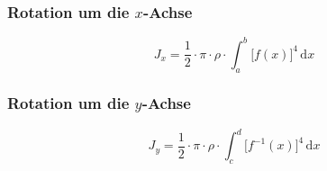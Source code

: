 \subsubsection{Rotation um die $x$-Achse}
\begin{equation}
\boxed{J_x=\dfrac{1}{2}\cdot \pi\cdot \rho\cdot \displaystyle \int_a^b\Big[f\left(x\right)\Big]^4\,\text{d}x}
\end{equation}
\subsubsection{Rotation um die $y$-Achse}
\begin{equation}
\boxed{J_y=\dfrac{1}{2}\cdot \pi\cdot \rho\cdot \displaystyle \int_c^d\Big[f^{-1}\left(x\right)\Big]^4\,\text{d}x}
\end{equation}
